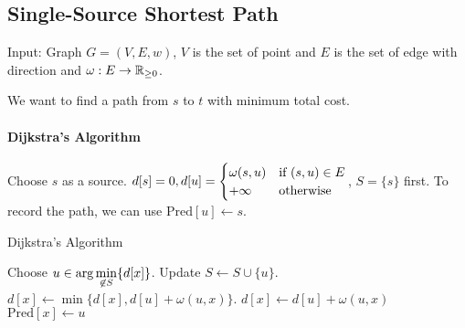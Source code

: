 \subsection{Single-Source Shortest Path}
\begin{example}
    Input: Graph $ G=(V,E,w) $,  $ V $ is the set of point and  $ E $ is the set of edge with direction  and  $ \omega:E\rightarrow \mathbb R_{ \geq 0} $.
    
    We want to find a path from  $ s $ to  $ t $ with minimum total cost.
\end{example}
\paragraph{Dijkstra's Algorithm}
Choose  $ s  $ as a source.  $ d[s]=0,d[u]=\begin{cases}
    \omega(s,u)&\text{if  $ (s,u)\in E $}\\
    +\infty &\text{otherwise}
\end{cases} $, $ S=\{s\} $ first. To record the path, we can use  $ \mathrm{Pred}[u]\leftarrow s $.  

\begin{algorithm}
    \caption{Dijkstra's Algorithm}
    \label{alg:dijkstra}
    \begin{algorithmic}[1]
        \STATE Choose  $ u\in \displaystyle\arg\min_{\not\in S}\{d[x]\} $.\label{Choose u min}
        \STATE Update  $ S\leftarrow S\cup\{u\} $.
            \STATE$ d[x]\leftarrow\min\{d[x],d[u]+\omega(u,x)\} $.
                \STATE  $ d[x]\leftarrow d[u]+\omega(u,x) $  
                \STATE  $ \mathrm{Pred}[x]\leftarrow u $  
            \ENDIF
        \ENDFOR 
    \ENDWHILE
    \end{algorithmic}
\end{algorithm}

